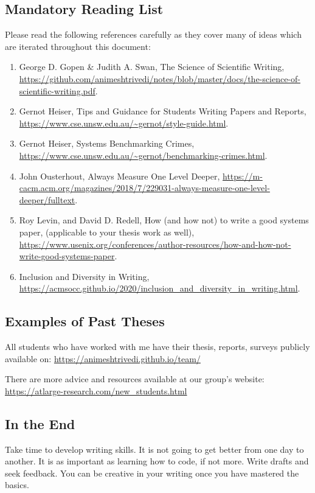 \subsection*{Mandatory Reading List}
Please read the following references carefully as they cover many of ideas which are iterated throughout this document:  
\begin{enumerate}
    \item George D. Gopen \& Judith A. Swan, The Science of Scientific Writing, \url{https://github.com/animeshtrivedi/notes/blob/master/docs/the-science-of-scientific-writing.pdf}. 
    \item Gernot Heiser, Tips and Guidance for Students Writing Papers and Reports, \url{https://www.cse.unsw.edu.au/~gernot/style-guide.html}. 
    \item Gernot Heiser, Systems Benchmarking Crimes, \url{https://www.cse.unsw.edu.au/~gernot/benchmarking-crimes.html}. 
    \item John Ousterhout, Always Measure One Level Deeper, \url{https://m-cacm.acm.org/magazines/2018/7/229031-always-measure-one-level-deeper/fulltext}. 
    \item Roy Levin, and David D. Redell,  How (and how not) to write a good systems paper, (applicable to your thesis work as well), \url{https://www.usenix.org/conferences/author-resources/how-and-how-not-write-good-systems-paper}.
    \item Inclusion and Diversity in Writing, \url{https://acmsocc.github.io/2020/inclusion_and_diversity_in_writing.html}. 
\end{enumerate}


\subsection*{Examples of Past Theses}

All students who have worked with me have their thesis, reports, surveys publicly available on: \url{https://animeshtrivedi.github.io/team/}


There are more advice and resources available at our group's website: \url{https://atlarge-research.com/new_students.html}


\subsection*{In the End}
Take time to develop writing skills. It is not going to get better from one day to another. It is as important as 
learning how to code, if not more. Write drafts and seek feedback. You can be creative in your writing once you 
have mastered the basics. 


